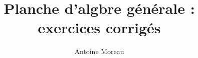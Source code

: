 \documentclass[a4paper,10pt]{article}
\title{Planche d'alg\g{e}bre g\'en\'erale : exercices corrig\'es}
\author{Antoine Moreau}
\begin{document}
\maketitle

\begin{abstract}

\end{abstract}




\end{document}
